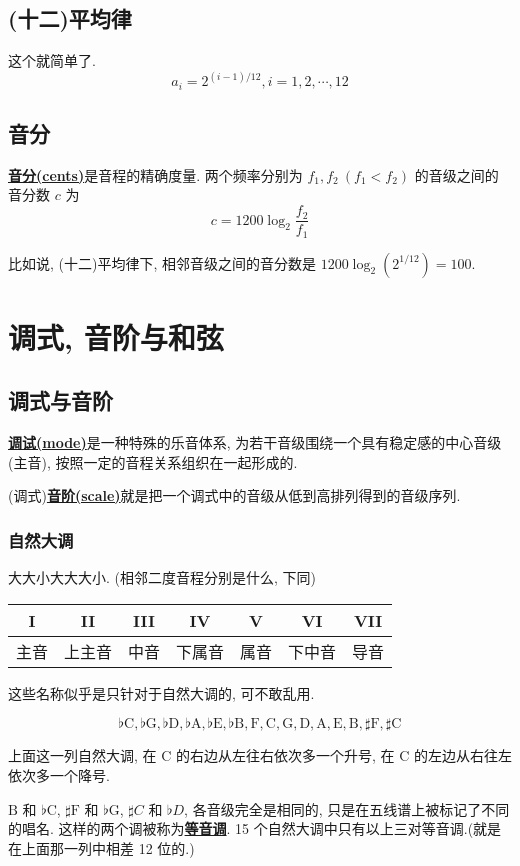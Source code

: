 \documentclass[8pt]{article}
\theoremstyle{compact}
\def\obj#1{\textbf{\uline{#1}}}
\def\E#1{\mathbb{E}\left[{#1}\right]}
\def\A{\textrm{A}}
\def\B{\textrm{B}}
\def\C{\textrm{C}}
\def\D{\textrm{D}}
\def\E{\textrm{E}}
\def\F{\textrm{F}}
\def\G{\textrm{G}}
\begin{document}
\subsection{(十二)平均律}
这个就简单了. $$a_i = 2^{(i-1) / 12}, i = 1, 2, \cdots, 12$$

\subsection{音分}

\obj{音分(cents)}是音程的精确度量. 两个频率分别为 $f_1, f_2 \ (f_1 < f_2)$ 的音级之间的音分数 $c$ 为 $$c = 1200\log_2\frac{f_2}{f_1}$$

比如说, (十二)平均律下, 相邻音级之间的音分数是 $1200\log_2\left(2^{1/12}\right) = 100$.


\section{调式, 音阶与和弦}

\subsection{调式与音阶}

\obj{调试(mode)}是一种特殊的乐音体系, 为若干音级围绕一个具有稳定感的中心音级(主音), 按照一定的音程关系组织在一起形成的.

(调式)\obj{音阶(scale)}就是把一个调式中的音级从低到高排列得到的音级序列.
\subsubsection{自然大调}
大大小大大大小. (相邻二度音程分别是什么, 下同)
\begin{center}
	\begin{tabular}{c|c|c|c|c|c|c}
		I & II & III & IV & V & VI & VII \\
		\hline
		主音 & 上主音 & 中音 & 下属音 & 属音 & 下中音 & 导音
	\end{tabular}
\end{center}
这些名称似乎是只针对于自然大调的, 可不敢乱用.

$$\flat \C, \flat \G, \flat \D, \flat \A, \flat \E, \flat \B, \F, \C, \G, \D, \A, \E, \B, \sharp \F, \sharp \C$$

上面这一列自然大调, 在 C 的右边从左往右依次多一个升号, 在 C 的左边从右往左依次多一个降号.

$\B$ 和 $\flat \C$, $\sharp\F$ 和 $\flat\G$, $\sharp C$ 和 $\flat D$, 各音级完全是相同的, 只是在五线谱上被标记了不同的唱名. 这样的两个调被称为\obj{等音调}. 15 个自然大调中只有以上三对等音调.(就是在上面那一列中相差 12 位的.)
\end{document}
